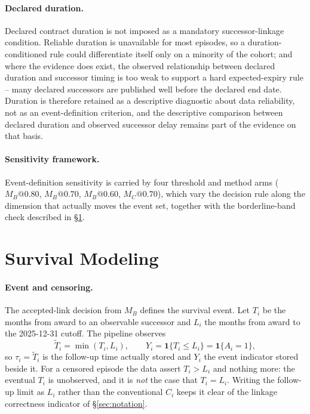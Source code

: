\documentclass[11pt,a4paper]{article}
\begin{document}
\paragraph{Declared duration.} Declared contract duration is not imposed as a
mandatory successor-linkage condition. Reliable duration is unavailable for most
episodes, so a duration-conditioned rule could differentiate itself only on a
minority of the cohort; and where the evidence does exist, the observed
relationship between declared duration and successor timing is too weak to
support a hard expected-expiry rule -- many declared successors are published
well before the declared end date. Duration is therefore retained as a
descriptive diagnostic about data reliability, not as an event-definition
criterion, and the descriptive comparison between declared duration and observed
successor delay remains part of the evidence on that basis.

\paragraph{Sensitivity framework.} Event-definition sensitivity is carried by
four threshold and method arms (\(M_B@0.80\), \(M_B@0.70\), \(M_B@0.60\),
\(M_C@0.70\)), which vary the decision rule along the dimension that actually
moves the event set, together with the borderline-band check described in
\S\ref{sec:survival-methods}.

\section{Survival Modeling}
\label{sec:survival-methods}
\paragraph{Event and censoring.} The accepted-link decision from \(M_B\)
defines the survival event. Let \(T_i\) be the months from award to an
observable successor and \(L_i\) the months from award to the 2025-12-31 cutoff.
The pipeline observes
\[
\tilde{T}_i=\min(T_i,L_i),
\qquad
Y_i=\mathbf{1}\{T_i\le L_i\}=\mathbf{1}\{A_i=1\} ,
\]
so \(\tau_i=\tilde{T}_i\) is the follow-up time actually stored and \(Y_i\)
the event indicator stored beside it. For a censored episode the data assert
\(T_i>L_i\) and nothing more: the eventual \(T_i\) is unobserved, and it is
\emph{not} the case that \(T_i=L_i\). Writing the follow-up limit as \(L_i\)
rather than the conventional \(C_i\) keeps it clear of the linkage correctness
indicator of \S\ref{sec:notation}.
\end{document}
